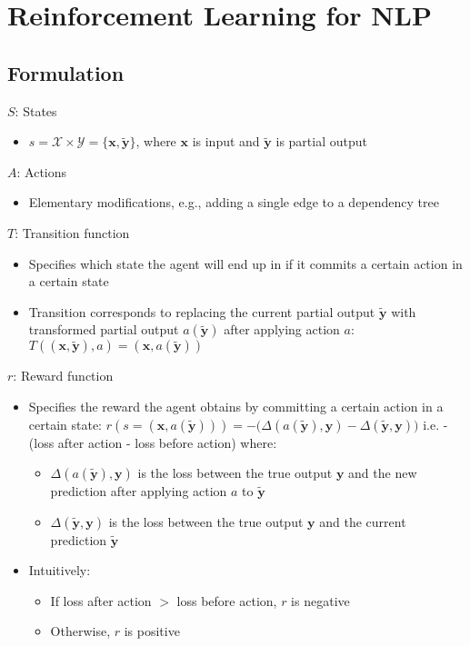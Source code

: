 \section{Reinforcement Learning for NLP}
\subsection*{Formulation}

$S$: States
\begin{itemize}
    \item $s = \mathcal{X} \times \mathcal{Y} = \{ \boldsymbol{x}, \tilde{\boldsymbol{y}} \}$, where $\boldsymbol{x}$ is input and $\tilde{\boldsymbol{y}}$ is partial output
\end{itemize}

$A$: Actions
\begin{itemize}
    \item Elementary modifications, e.g., adding a single edge to a dependency tree
\end{itemize}

$T$: Transition function
\begin{itemize}
    \item Specifies which state the agent will end up in if it commits a certain action in a certain state
    \item Transition corresponds to replacing the current partial output $\tilde{\boldsymbol{y}}$ with transformed partial output $a(\tilde{\boldsymbol{y}})$ after applying action $a$:
    $
    T(( \boldsymbol{x}, \tilde{\boldsymbol{y}} ), a) = ( \boldsymbol{x}, a(\tilde{\boldsymbol{y}}) )
    $
\end{itemize}

$r$: Reward function
\begin{itemize}
    \item Specifies the reward the agent obtains by committing a certain action in a certain state:
    $
    r(s = ( \boldsymbol{x}, a(\tilde{\boldsymbol{y}}) )) = -\big(\Delta(a(\tilde{\boldsymbol{y}}), \boldsymbol{y}) - \Delta(\tilde{\boldsymbol{y}}, \boldsymbol{y})\big)
    $ i.e.  -(loss after action - loss before action)
    where:
    \begin{itemize}
        \item $\Delta(a(\tilde{\boldsymbol{y}}), \boldsymbol{y})$ is the loss between the true output $\boldsymbol{y}$ and the new prediction after applying action $a$ to $\tilde{\boldsymbol{y}}$
        \item $\Delta(\tilde{\boldsymbol{y}}, \boldsymbol{y})$ is the loss between the true output $\boldsymbol{y}$ and the current prediction $\tilde{\boldsymbol{y}}$
    \end{itemize}
    \item Intuitively:
    \begin{itemize}
        \item If loss after action $>$ loss before action, $r$ is negative
        \item Otherwise, $r$ is positive
    \end{itemize}
\end{itemize}

